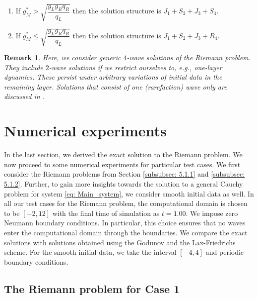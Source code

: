 \documentclass[11pt]{article}
\numberwithin{equation}{section}
\newtheorem{counter example}[theorem]{Counter Example}
\newtheorem{remark}[theorem] {Remark}
\begin{document}
{\begin{enumerate}
    \item If $g_M^*>\sqrt{\dfrac{g_Lg_Rq_R}{q_L}}$ then the solution structure is $J_1+S_2+J_3+S_4$.
    \item If $g_M^*\leq \sqrt{\dfrac{g_Lg_Rq_R}{q_L}}$ then the solution structure is $J_1+S_2+J_3+R_4$.
\end{enumerate}
\begin{remark}
Here,  we consider generic $4$-wave solutions of the Riemann problem.  They include  $2$-wave solutions if we restrict ourselves to, e.g.,  one-layer dynamics. These persist 
under arbitrary variations of initial data in the remaining layer.   Solutions that consist of one (rarefaction) wave only are discussed in \cite{barthwal2025generalized}.      
\end{remark}
\section{Numerical experiments}\label{sec: 6}
In the last section, we derived the exact solution to the Riemann problem. We now proceed to some numerical experiments for particular test cases. We first consider the Riemann problems from Section \ref{subsubsec: 5.1.1} and \ref{subsubsec: 5.1.2}. Further, to gain more insights towards the solution to a general Cauchy problem for system \eqref{eq: Main_system}, we consider smooth initial data as well. In all our test cases for the Riemann problem, the computational domain is chosen to be $[-2, 12]$ with the final time of simulation as $t=1.00$. We impose zero Neumann boundary conditions. In particular, this choice ensures that no waves enter the computational domain through the boundaries.  We compare the exact solutions with solutions obtained using the Godunov and the Lax-Friedrichs scheme. For the smooth initial data, we take the interval $[-4,4]$ and periodic boundary conditions. 
\subsection{The Riemann problem for Case 1}


}
\end{document}
